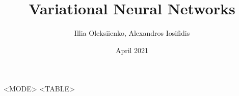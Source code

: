 \documentclass{article}
\title{Variational Neural Networks}
\author{Illia Oleksiienko, Alexandros Iosifidis}
\date{April 2021}
\begin{document}
\maketitle

\begin{center}
    \begin{tabular}{<MODE>}
    <TABLE>
    \end{tabular}
\end{center}
\end{document}
